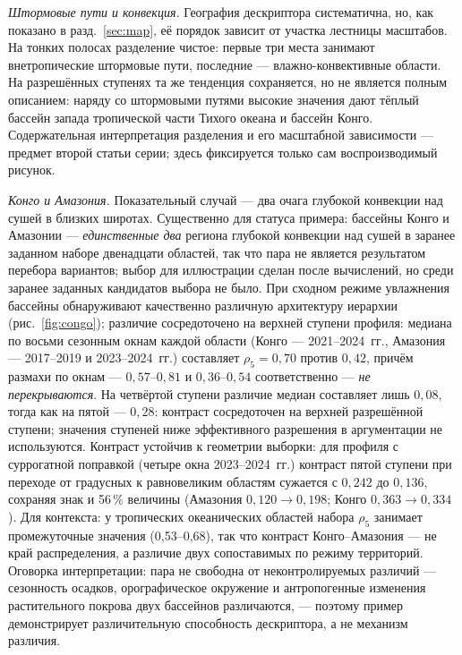 \documentclass[11pt,a4paper]{article}
\begin{document}
\emph{Штормовые пути и конвекция.} География дескриптора систематична, но, как показано в разд.~\ref{sec:map}, её порядок зависит от участка лестницы масштабов. На тонких полосах разделение чистое: первые три места занимают внетропические штормовые пути, последние --- влажно-конвективные области. На разрешённых ступенях та же тенденция сохраняется, но не является полным описанием: наряду со штормовыми путями высокие значения дают тёплый бассейн запада тропической части Тихого океана и бассейн Конго. Содержательная интерпретация разделения и его масштабной зависимости --- предмет второй статьи серии; здесь фиксируется только сам воспроизводимый рисунок.

\emph{Конго и Амазония.} Показательный случай --- два очага глубокой конвекции над сушей в близких широтах. Существенно для статуса примера: бассейны Конго и Амазонии --- \emph{единственные два} региона глубокой конвекции над сушей в заранее заданном наборе двенадцати областей, так что пара не является результатом перебора вариантов; выбор для иллюстрации сделан после вычислений, но среди заранее заданных кандидатов выбора не было. При сходном режиме увлажнения бассейны обнаруживают качественно различную архитектуру иерархии (рис.~\ref{fig:congo}); различие сосредоточено на верхней ступени профиля: медиана по восьми сезонным окнам каждой области (Конго --- 2021--2024~гг., Амазония --- 2017--2019 и 2023--2024~гг.) составляет $\rho_5=0{,}70$ против $0{,}42$, причём размахи по окнам --- $0{,}57$--$0{,}81$ и $0{,}36$--$0{,}54$ соответственно --- \emph{не перекрываются}. На четвёртой ступени различие медиан составляет лишь $0{,}08$, тогда как на пятой --- $0{,}28$: контраст сосредоточен на верхней разрешённой ступени; значения ступеней ниже эффективного разрешения в аргументации не используются. Контраст устойчив к геометрии выборки: для профиля с суррогатной поправкой (четыре окна 2023--2024~гг.) контраст пятой ступени при переходе от градусных к равновеликим областям сужается с $0{,}242$ до $0{,}136$, сохраняя знак и 56\,\% величины (Амазония $0{,}120\to0{,}198$; Конго $0{,}363\to0{,}334$). Для контекста: у тропических океанических областей набора $\rho_5$ занимает промежуточные значения (0,53--0,68), так что контраст Конго--Амазония --- не край распределения, а различие двух сопоставимых по режиму территорий. Оговорка интерпретации: пара не свободна от неконтролируемых различий --- сезонность осадков, орографическое окружение и антропогенные изменения растительного покрова двух бассейнов различаются, --- поэтому пример демонстрирует различительную способность дескриптора, а не механизм различия.
\end{document}
